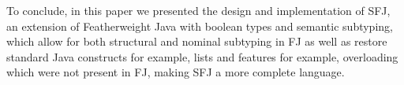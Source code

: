 \documentclass[runningheads]{llncs}
\begin{document}
To conclude, in this paper we presented the design and implementation of SFJ, an extension of Featherweight Java with boolean types and semantic subtyping, which allow for both structural and nominal subtyping in FJ as well as restore standard Java constructs for example, lists and features for example, overloading which were not present in FJ, making SFJ a more complete language.

\newpage


\end{document}
